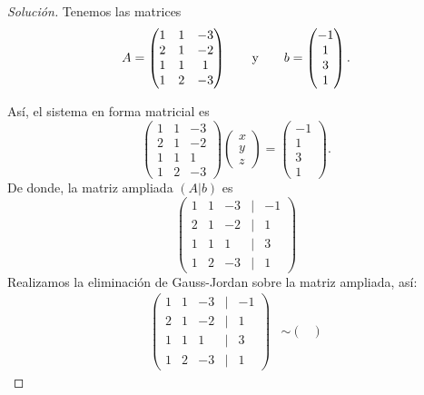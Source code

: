 \documentclass[a4,11pt]{aleph-notas}
\begin{document}
\begin{proof}[Solución]\hspace{0pt}
    Tenemos las matrices
    \[
        A = \begin{pmatrix}
            1&1&-3\\2&1&-2\\1&1&1\\1&2&-3
        \end{pmatrix}
        \qquad\text{y}\qquad
        b = \begin{pmatrix}
             -1 \\ 1\\ 3 \\ 1
        \end{pmatrix}.
    \]
    
    Así, el sistema en forma matricial es
    \[
        \begin{pmatrix}
            1&1&-3\\2&1&-2\\1&1&1\\1&2&-3
        \end{pmatrix}
        \begin{pmatrix}
            x \\ y\\ z
        \end{pmatrix}
        =
        \begin{pmatrix}
            -1 \\ 1\\ 3 \\ 1
        \end{pmatrix}.
    \]
    De donde, la matriz ampliada $(A|b)$ es
    \[
        \begin{pmatrix}
            1&1&-3&|&-1\\
            2&1&-2&|&1\\
            1&1&1&|&3\\
            1&2&-3&|&1
         \end{pmatrix}
    \]
    Realizamos la eliminación de Gauss-Jordan sobre la matriz ampliada, así:
    \begin{align*}
        \begin{pmatrix}
            1&1&-3&|&-1\\
            2&1&-2&|&1\\
            1&1&1&|&3\\
            1&2&-3&|&1
        \end{pmatrix}
        & \sim 
        \begin{pmatrix}

\end{pmatrix}
\end{align*}
\end{proof}
\end{document}
